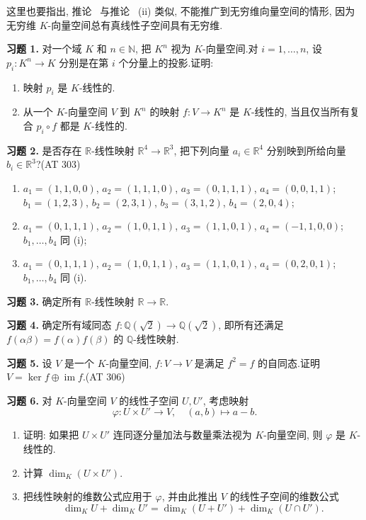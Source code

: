 这里也要指出, 推论~ 与推论~ (ii) 类似, 不能推广到无穷维向量空间的情形, 因为无穷维 $K$-向量空间总有真线性子空间具有无穷维.

\aufgaben

\noindent\textbf{习题 1.} 对一个域 $K$ 和 $n \in \mathbb{N}$, 把 $K^n$ 视为 $K$-向量空间.对 $i = 1, \ldots, n$, 设 $p_i \colon K^n \longrightarrow K$ 分别是在第 $i$ 个分量上的投影.证明:
\begin{enumerate}
\item[(i)] 映射 $p_i$ 是 $K$-线性的.
\item[(ii)] 从一个 $K$-向量空间 $V$ 到 $K^n$ 的映射 $f \colon V \longrightarrow K^n$ 是 $K$-线性的, 当且仅当所有复合 $p_i \circ f$ 都是 $K$-线性的.
\end{enumerate}

\noindent\textbf{习题 2.} 是否存在 $\mathbb{R}$-线性映射 $\mathbb{R}^4 \longrightarrow \mathbb{R}^3$, 把下列向量 $a_i \in \mathbb{R}^4$ 分别映到所给向量 $b_i \in \mathbb{R}^3$?(AT 303)
\begin{enumerate}
\item[(i)] $a_1 = (1, 1, 0, 0)$, $a_2 = (1, 1, 1, 0)$, $a_3 = (0, 1, 1, 1)$, $a_4 = (0, 0, 1, 1)$;
$b_1 = (1, 2, 3)$, $b_2 = (2, 3, 1)$, $b_3 = (3, 1, 2)$, $b_4 = (2, 0, 4)$;
\item[(ii)] $a_1 = (0, 1, 1, 1)$, $a_2 = (1, 0, 1, 1)$, $a_3 = (1, 1, 0, 1)$, $a_4 = (-1, 1, 0, 0)$;$b_1, \ldots, b_4$ 同 (i);
\item[(iii)] $a_1 = (0, 1, 1, 1)$, $a_2 = (1, 0, 1, 1)$, $a_3 = (1, 1, 0, 1)$, $a_4 = (0, 2, 0, 1)$;$b_1, \ldots, b_4$ 同 (i).
\end{enumerate}

\noindent\textbf{习题 3.} 确定所有 $\mathbb{R}$-线性映射 $\mathbb{R} \longrightarrow \mathbb{R}$.

\noindent\textbf{习题 4.} 确定所有域同态 $f \colon \mathbb{Q}(\sqrt{2}) \longrightarrow \mathbb{Q}(\sqrt{2})$, 即所有还满足 $f(\alpha\beta) = f(\alpha)f(\beta)$ 的 $\mathbb{Q}$-线性映射.

\noindent\textbf{习题 5.} 设 $V$ 是一个 $K$-向量空间, $f \colon V \longrightarrow V$ 是满足 $f^2 = f$ 的自同态.证明 $V = \ker f \oplus \operatorname{im} f$.(AT 306)

\noindent\textbf{习题 6.} 对 $K$-向量空间 $V$ 的线性子空间 $U, U'$, 考虑映射
\[
\varphi \colon U \times U' \longrightarrow V, \quad (a, b) \longmapsto a - b\text{.}
\]
\begin{enumerate}
\item[(i)] 证明: 如果把 $U \times U'$ 连同逐分量加法与数量乘法视为 $K$-向量空间, 则 $\varphi$ 是 $K$-线性的.
\item[(ii)] 计算 $\dim_K(U \times U')$.
\item[(iii)] 把线性映射的维数公式应用于 $\varphi$, 并由此推出 $V$ 的线性子空间的维数公式
\[
\dim_K U + \dim_K U' = \dim_K(U + U') + \dim_K(U \cap U')\text{.}
\]
\end{enumerate}

